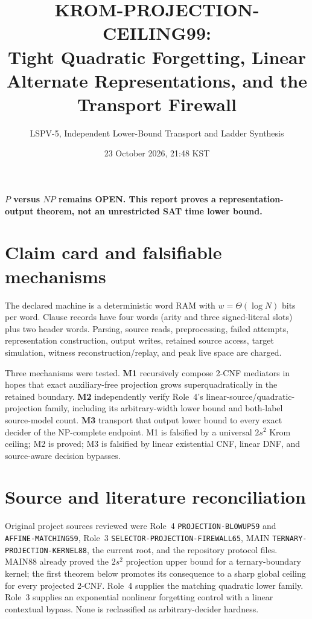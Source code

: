 \documentclass[11pt]{article}
\title{KROM-PROJECTION-CEILING99:\\Tight Quadratic Forgetting, Linear Alternate Representations, and the Transport Firewall}
\author{LSPV-5, Independent Lower-Bound Transport and Ladder Synthesis}
\date{23 October 2026, 21:48 KST}
\begin{document}
\maketitle
\begin{center}\textbf{$P$ versus $NP$ remains OPEN. This report proves a representation-output theorem, not an unrestricted SAT time lower bound.}\end{center}

\section{Claim card and falsifiable mechanisms}
The declared machine is a deterministic word RAM with $w=\Theta(\log N)$ bits per word. Clause records have four words (arity and three signed-literal slots) plus two header words. Parsing, source reads, preprocessing, failed attempts, representation construction, output writes, retained source access, target simulation, witness reconstruction/replay, and peak live space are charged.

Three mechanisms were tested. \textbf{M1} recursively compose 2-CNF mediators in hopes that exact auxiliary-free projection grows superquadratically in the retained boundary. \textbf{M2} independently verify Role~4's linear-source/quadratic-projection family, including its arbitrary-width lower bound and both-label source-model count. \textbf{M3} transport that output lower bound to every exact decider of the NP-complete endpoint. M1 is falsified by a universal $2s^2$ Krom ceiling; M2 is proved; M3 is falsified by linear existential CNF, linear DNF, and source-aware decision bypasses.

\section{Source and literature reconciliation}
Original project sources reviewed were Role~4 \texttt{PROJECTION-BLOWUP59} and \texttt{AFFINE-MATCHING59}, Role~3 \texttt{SELECTOR-PROJECTION-FIREWALL65}, MAIN \texttt{TERNARY-PROJECTION-KERNEL88}, the current root, and the repository protocol files. MAIN88 already proved the $2s^2$ projection upper bound for a ternary-boundary kernel; the first theorem below promotes its consequence to a sharp global ceiling for every projected 2-CNF. Role~4 supplies the matching quadratic lower family. Role~3 supplies an exponential nonlinear forgetting control with a linear contextual bypass. None is reclassified as arbitrary-decider hardness.
\end{document}
